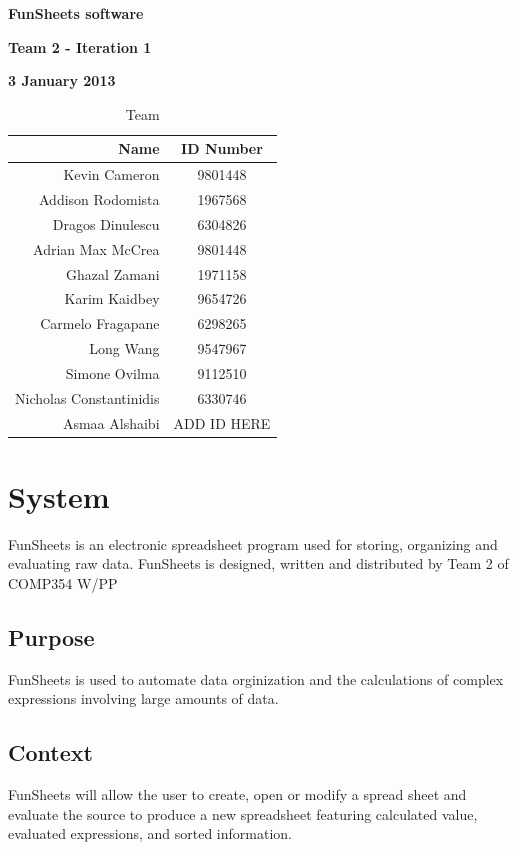 \documentclass[12pt]{article}
\begin{document}
\vspace*{0.5in}
\centerline{\bf\Large FunSheets software}

\vspace*{0.5in}
\centerline{\bf\Large Team 2 - Iteration 1}

\vspace*{0.5in}
\centerline{\bf\Large 3 January 2013}

\vspace*{1.5in}
\begin{table}[htbp]
\caption{Team}
\begin{center}
\begin{tabular}{|r | c|}
\hline
Name & ID Number \\\hline\hline
Kevin Cameron & 9801448 \\\hline\hline
Addison Rodomista & 1967568 \\\hline\hline
Dragos Dinulescu & 6304826 \\\hline\hline
Adrian Max McCrea & 9801448 \\\hline\hline
Ghazal Zamani & 1971158 \\\hline\hline
Karim Kaidbey & 9654726 \\\hline\hline
Carmelo Fragapane & 6298265 \\\hline\hline
Long Wang & 9547967 \\\hline\hline
Simone Ovilma & 9112510 \\\hline\hline
Nicholas Constantinidis & 6330746 \\\hline\hline
Asmaa Alshaibi & ADD ID HERE \\\hline
\end{tabular}
\end{center}
\end{table}

\clearpage

\section{System}
FunSheets is an electronic spreadsheet program used for storing, organizing and evaluating raw data. FunSheets is designed, written and distributed by Team 2 of COMP354 W/PP

\subsection{Purpose}
FunSheets is used to automate data orginization and the calculations of complex expressions involving large amounts of data.
\subsection{Context}
FunSheets will allow the user to create, open or modify a spread sheet and evaluate the source to produce a new spreadsheet featuring calculated value, evaluated expressions, and sorted information.
\end{document}
